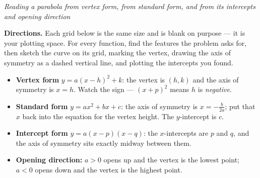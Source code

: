 \documentclass[12pt]{article}
\begin{document}

\begin{center}
\textit{Reading a parabola from vertex form, from standard form, and from its
intercepts and opening direction}
\end{center}

\noindent\textbf{Directions.} Each grid below is the same size and is blank on
purpose --- it is your plotting space. For every function, find the features
the problem asks for, then sketch the curve on its grid, marking the vertex,
drawing the axis of symmetry as a dashed vertical line, and plotting the
intercepts you found.
\begin{itemize}[leftmargin=1.2cm, itemsep=2pt, topsep=2pt]
\item \textbf{Vertex form} $y = a(x-h)^2 + k$: the vertex is $(h,k)$ and the
axis of symmetry is $x = h$. Watch the sign --- $(x+p)^2$ means $h$ is
\emph{negative}.
\item \textbf{Standard form} $y = ax^2 + bx + c$: the axis of symmetry is
$x = -\frac{b}{2a}$; put that $x$ back into the equation for the vertex
height. The $y$-intercept is $c$.
\item \textbf{Intercept form} $y = a(x-p)(x-q)$: the $x$-intercepts are $p$ and
$q$, and the axis of symmetry sits exactly midway between them.
\item \textbf{Opening direction:} $a > 0$ opens up and the vertex is the
lowest point; $a < 0$ opens down and the vertex is the highest point.
\end{itemize}

\end{document}
